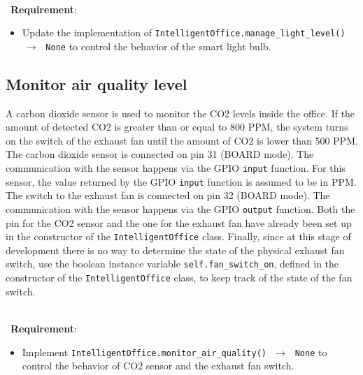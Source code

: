 \ \\ \
\noindent\textbf{Requirement}:
\begin{itemize}
    \item Update the implementation of \texttt{IntelligentOffice.manage\_light\_level() $\,\to\,$ None} to control the behavior of the smart light bulb.
\end{itemize}


\subsection{Monitor air quality level}
A carbon dioxide sensor is used to monitor the CO2 levels inside the office. If the amount of detected CO2 is greater than or equal to 800 PPM, the system turns on the switch of the exhaust fan until the amount of CO2 is lower than 500 PPM.
The carbon dioxide sensor is connected on pin 31 (BOARD mode). The communication with the sensor happens via the GPIO \texttt{input} function. For this sensor, the value returned by the GPIO \texttt{input} function is assumed to be in PPM. 
The switch to the exhaust fan is connected on pin 32 (BOARD mode). The communication with the sensor happens via the GPIO \texttt{output} function.
Both the pin for the CO2 sensor and the one for the exhaust fan have already been set up in the constructor of the \texttt{IntelligentOffice} class. 
Finally, since at this stage of development there is no way to determine the state of the physical exhaust fan switch, use the boolean instance variable \texttt{self.fan\_switch\_on}, defined in the constructor of the \texttt{IntelligentOffice} class, to keep track of the state of the fan switch.

\ \\ \
\noindent\textbf{Requirement}:
\begin{itemize}
    \item Implement \texttt{IntelligentOffice.monitor\_air\_quality() $\,\to\,$ None} to control the behavior of CO2 sensor and the exhaust fan switch.
\end{itemize}
